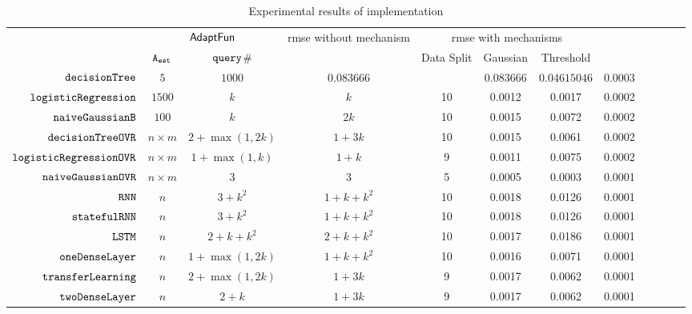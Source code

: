 {\footnotesize
\begin {table}[H]
\vspace{-0.4cm}
    \caption{Experimental results of {\THESYSTEM} implementation}
    \vspace{-0.5cm}
        \label{tb:adapt-imp}
        \begin{center}
        \centering
{\tiny
        \begin{tabular}{| >{\tiny}r | c | c | c | c | c | c | c | c | c | c | c }
         \hline \hline
        \multirow{2}{*}{Program $c$}
         & \multicolumn{2}{c|}{$\textsf{AdaptFun}$}
         & \multirow{2}{*}{rmse without mechanism}
         & \multicolumn{3}{c|}{rmse with mechanisms} & \\ 
         \cline{2-3} \cline{5-7}
         & {${\mathtt{A_{est}}}$ } & {${\tt query}$\# } &  & Data Split & Gaussian & Threshold & \\ 
         \cline{6-8}
         \hline \hline
         $  \mathtt{decisionTree}$ & $5$ &  $1000$ & $0.083666$  & $ $ & $0.083666$ &$0.04615046$ & 0.0003 \\
         $  \mathtt{logisticRegression}$ & $1500$ &  $k$ & $k$  &  10 & 0.0012 & 0.0017  & 0.0002 \\
         $  \mathtt{naiveGaussianB}$ & $100$ & $k  $ & $ 2k $  &  10 & 0.0015 & 0.0072  & 0.0002  \\
         $  \mathtt{decisionTreeOVR}$ & $n\times m$ &  $2+\max(1,2k)  $ & $1 + 3 k  $  &  10 & 0.0015 & 0.0061  & 0.0002 \\
         $  \mathtt{logisticRegressionOVR}$    & $n\times m$ &  $1+ \max(1, k) $ & $1 + k $  &  9 & 0.0011 & 0.0075  & 0.0002 \\
         $  \mathtt{naiveGaussianOVR}$ & $n\times m$ & $3 $ &   $3$  & 5 & 0.0005 & 0.0003   & 0.0001 \\
         $  \mathtt{RNN}$ & $n$ &   $3 + k^2$ & $1 + k + k^2 $   &  10 & 0.0018 & 0.0126  & 0.0001  \\
         $  \mathtt{statefulRNN}$ & $n$ &   $3 + k^2$ & $1 + k + k^2 $   &  10 & 0.0018 & 0.0126  & 0.0001  \\
         $  \mathtt{LSTM}$ & $n$ &  $ 2 + k +  k^2 $   &  $2 + k + k^2$   &  10 & 0.0017 & 0.0186  & 0.0001  \\
         $  \mathtt{oneDenseLayer}$ & $n$ & $1 + \max(1,2k) $ &  $1 + k + k^2 $  & 10 & 0.0016 & 0.0071  & 0.0001  \\
         {$ \mathtt{transferLearning}$} & $n$ &  $ 2 + \max(1,2k) $ & $1 + 3k  $  &  9 & 0.0017 & 0.0062  & 0.0001  \\
         {$ \mathtt{twoDenseLayer}$} & $n$ &  $ 2 + k $ & $1 + 3k  $  &  9 & 0.0017 & 0.0062  & 0.0001  \\

\end{tabular}}
\end{center}
\end{table}}
